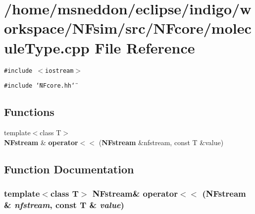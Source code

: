 \section{/home/msneddon/eclipse/indigo/workspace/NFsim/src/NFcore/moleculeType.cpp File Reference}
\label{moleculeType_8cpp}


{\tt \#include $<$iostream$>$}\par
{\tt \#include \char`\"{}NFcore.hh\char`\"{}}\par
\subsection*{Functions}
\begin{CompactItemize}
\item 
{\footnotesize template$<$class T$>$ }\\{\bf NFstream} \& {\bf operator$<$$<$} ({\bf NFstream} \&nfstream, const T \&value)
\end{CompactItemize}


\subsection{Function Documentation}
\subsubsection{\setlength{\rightskip}{0pt plus 5cm}template$<$class T$>$ {\bf NFstream}\& operator$<$$<$ ({\bf NFstream} \& {\em nfstream}, const T \& {\em value})\hspace{0.3cm}{\tt  [inline]}}\label{moleculeType_8cpp_ef588953052314e1b69285568a59947f}


